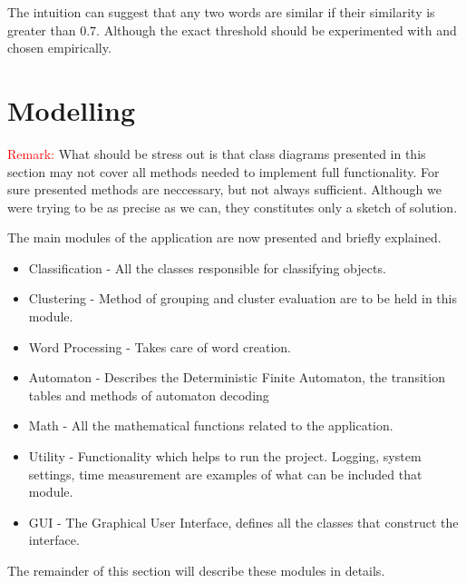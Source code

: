 \documentclass{article}
\begin{document}
The intuition can suggest that any two words are similar if their similarity is greater than $0.7$. Although the exact threshold should be experimented with and chosen empirically.






\section{Modelling} \label{sec:model}

\textcolor{red}{Remark:} What should be stress out is that class diagrams presented in this section may not cover all methods needed to implement full functionality. For sure presented methods are neccessary, but not always sufficient. Although we were trying to be as precise as we can, they constitutes only a sketch of solution.

The main modules of the application are now presented and briefly explained.

\begin{itemize}

	\item 
		{{Classification}} - All the classes responsible for classifying objects.
	\item 
		{{Clustering}} - Method of grouping and cluster evaluation are to be held in this module.
	\item
		{{Word Processing}} - Takes care of word creation.
	\item 
		{{Automaton}} - Describes the Deterministic Finite Automaton, the transition tables and methods of automaton decoding 
	\item 
		{{Math}} - All the mathematical functions related to the application.
	\item 
		{{Utility}} - Functionality which helps to run the project. Logging, system settings, time measurement are examples of what can be included that module.
	\item 
		{{GUI}} - The Graphical User Interface, defines all the classes that construct the interface.
		
\end{itemize}

The remainder of this section will describe these modules in details.
\end{document}
